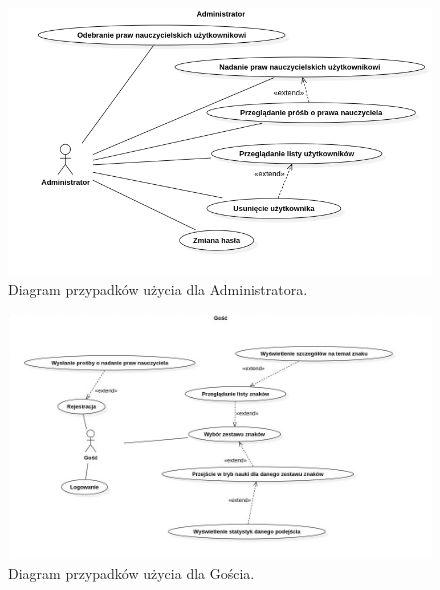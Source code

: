 \documentclass[a4paper,twoside,12pt]{book}
\begin{document}
\begin{figure}[]
\centering
\includegraphics[width=\textwidth]{Admin}
\caption{Diagram przypadków użycia dla Administratora.}
\label{fig:admin}
\end{figure}
\begin{figure}[]
\centering
\includegraphics[width=\textwidth]{Gość}
\caption{Diagram przypadków użycia dla Gościa.}
\label{fig:guest}
\end{figure}


\end{document}
